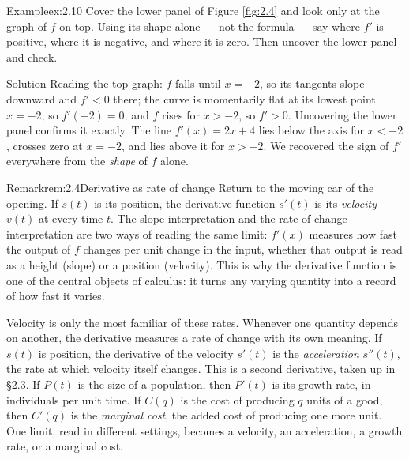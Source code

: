 \documentclass[a4paper,12pt,oneside]{memoir}
\begin{document}
\begin{workedexample}
\begin{envexample}{Example}{ex:2.10}{}
Cover the lower panel of Figure \ref{fig:2.4} and look only at the graph of \(f\) on top. Using its shape alone — not the formula — say where \(f'\) is positive, where it is negative, and where it is zero. Then uncover the lower panel and check.
\end{envexample}
\begin{envsolution}{Solution}{}{}
Reading the top graph: \(f\) falls until \(x = -2\), so its tangents slope downward and \(f' < 0\) there; the curve is momentarily flat at its lowest point \(x = -2\), so \(f'(-2) = 0\); and \(f\) rises for \(x > -2\), so \(f' > 0\). Uncovering the lower panel confirms it exactly. The line \(f'(x) = 2x + 4\) lies below the axis for \(x < -2\), crosses zero at \(x = -2\), and lies above it for \(x > -2\). We recovered the sign of \(f'\) everywhere from the \emph{shape} of \(f\) alone.
\end{envsolution}
\end{workedexample}
\begin{envremark}{Remark}{rem:2.4}{Derivative as rate of change}
Return to the moving car of the opening. If \(s(t)\) is its position, the derivative function \(s'(t)\) is its \emph{velocity} \(v(t)\) at every time \(t\). The slope interpretation and the rate-of-change interpretation are two ways of reading the same limit: \(f'(x)\) measures how fast the output of \(f\) changes per unit change in the input, whether that output is read as a height (slope) or a position (velocity). This is why the derivative function is one of the central objects of calculus: it turns any varying quantity into a record of how fast it varies.
\end{envremark}
Velocity is only the most familiar of these rates. Whenever one quantity depends on another, the derivative measures a rate of change with its own meaning. If \(s(t)\) is position, the derivative of the velocity \(s'(t)\) is the \emph{acceleration} \(s''(t)\), the rate at which velocity itself changes. This is a second derivative, taken up in §2.3. If \(P(t)\) is the size of a population, then \(P'(t)\) is its growth rate, in individuals per unit time. If \(C(q)\) is the cost of producing \(q\) units of a good, then \(C'(q)\) is the \emph{marginal cost}, the added cost of producing one more unit. One limit, read in different settings, becomes a velocity, an acceleration, a growth rate, or a marginal cost.
\end{document}
